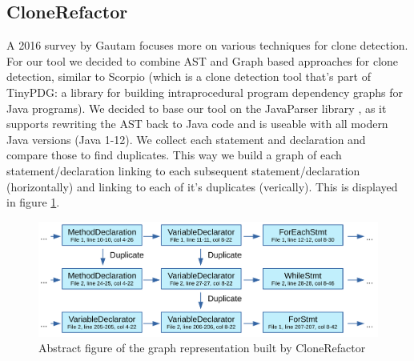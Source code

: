 \documentclass[a4paper]{article}
\begin{document}
\subsection{CloneRefactor}
A 2016 survey by Gautam \cite{gautam2016various} focuses more on various techniques for clone detection. For our tool we decided to combine AST and Graph based approaches for clone detection, similar to Scorpio (which is a clone detection tool that's part of TinyPDG: a library for building intraprocedural program dependency graphs for Java programs). We decided to base our tool on the JavaParser library \cite{tomassetti2017javaparser}, as it supports rewriting the AST back to Java code and is useable with all modern Java versions (Java 1-12). We collect each statement and declaration and compare those to find duplicates. This way we build a graph of each statement/declaration linking to each subsequent statement/declaration (horizontally) and linking to each of it's duplicates (verically). This is displayed in figure \ref{fig:clonerefactor}.

\begin{figure}[H]
  \includegraphics[width=1\columnwidth]{img/CodeGraph}
  \caption{Abstract figure of the graph representation built by CloneRefactor}
  \label{fig:clonerefactor}
\end{figure}
\end{document}
